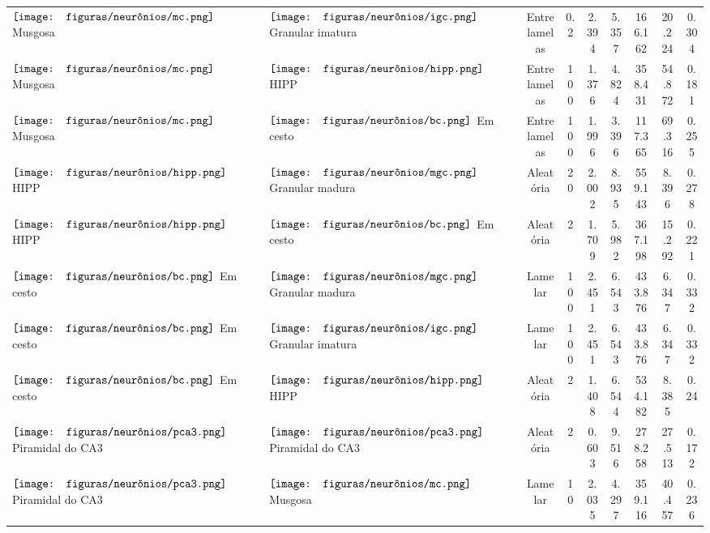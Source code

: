 \begin{table}[h!]
{\begin{tabular}{llccccccc}
$\vcenter{\hbox{\texttt{[image: figuras/neurônios/mc.png]}}}$ Musgosa & $\vcenter{\hbox{\texttt{[image: figuras/neurônios/igc.png]}}}$ Granular imatura & Entre lamelas & 0.2 & 2.394 & 5.357 & 166.162 & 20.224 & 0.304 \\
$\vcenter{\hbox{\texttt{[image: figuras/neurônios/mc.png]}}}$ Musgosa & $\vcenter{\hbox{\texttt{[image: figuras/neurônios/hipp.png]}}}$ HIPP & Entre lamelas & 100 & 1.376 & 4.824 & 358.431 & 54.872 & 0.181 \\
$\vcenter{\hbox{\texttt{[image: figuras/neurônios/mc.png]}}}$ Musgosa & $\vcenter{\hbox{\texttt{[image: figuras/neurônios/bc.png]}}}$ Em cesto & Entre lamelas & 100 & 1.996 & 3.396 & 117.365 & 69.316 & 0.255 \\
$\vcenter{\hbox{\texttt{[image: figuras/neurônios/hipp.png]}}}$ HIPP & $\vcenter{\hbox{\texttt{[image: figuras/neurônios/mgc.png]}}}$ Granular madura & Aleatória & 20 & 2.002 & 8.935 & 559.143 & 8.396 & 0.278 \\
$\vcenter{\hbox{\texttt{[image: figuras/neurônios/hipp.png]}}}$ HIPP & $\vcenter{\hbox{\texttt{[image: figuras/neurônios/bc.png]}}}$ Em cesto & Aleatória & 2 & 1.709 & 5.982 & 367.198 & 15.292 & 0.221 \\
$\vcenter{\hbox{\texttt{[image: figuras/neurônios/bc.png]}}}$ Em cesto & $\vcenter{\hbox{\texttt{[image: figuras/neurônios/mgc.png]}}}$ Granular madura & Lamelar & 100 & 2.451 & 6.543 & 433.876 & 6.347 & 0.332 \\
$\vcenter{\hbox{\texttt{[image: figuras/neurônios/bc.png]}}}$ Em cesto & $\vcenter{\hbox{\texttt{[image: figuras/neurônios/igc.png]}}}$ Granular imatura & Lamelar & 100 & 2.451 & 6.543 & 433.876 & 6.347 & 0.332 \\
$\vcenter{\hbox{\texttt{[image: figuras/neurônios/bc.png]}}}$ Em cesto & $\vcenter{\hbox{\texttt{[image: figuras/neurônios/hipp.png]}}}$ HIPP & Aleatória & 2 & 1.408 & 6.544 & 534.182 & 8.385 & 0.24 \\
$\vcenter{\hbox{\texttt{[image: figuras/neurônios/pca3.png]}}}$ Piramidal do CA3 & $\vcenter{\hbox{\texttt{[image: figuras/neurônios/pca3.png]}}}$ Piramidal do CA3 & Aleatória & 2 & 0.603 & 9.516 & 278.258 & 27.513 & 0.172 \\
$\vcenter{\hbox{\texttt{[image: figuras/neurônios/pca3.png]}}}$ Piramidal do CA3 & $\vcenter{\hbox{\texttt{[image: figuras/neurônios/mc.png]}}}$ Musgosa & Lamelar & 10 & 2.035 & 4.297 & 359.116 & 40.457 & 0.236 \\

\end{tabular}}
\end{table}
